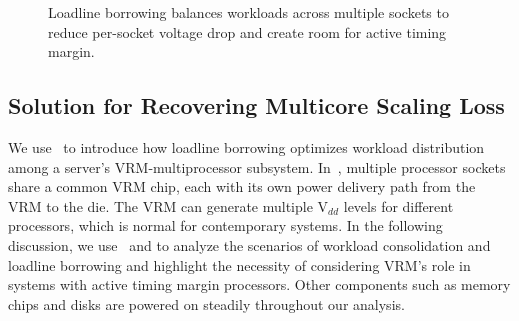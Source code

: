 \begin{figure}[!b]
\centering
\vspace*{-10pt}
\hfill
{}
\caption{Loadline borrowing balances workloads across multiple sockets to reduce per-socket voltage drop and create room for active timing margin.}
\label{fig:ll-borrow-idea}
\end{figure}

\subsection{Solution for Recovering Multicore Scaling Loss}
\label{sec:voltage:opt:loadline}

We use~ to introduce how loadline borrowing optimizes workload distribution among a server's VRM-multiprocessor subsystem. In~, multiple processor sockets share a common VRM chip, each with its own power delivery path from the VRM to the die. The VRM can generate multiple V$_{dd}$ levels for different processors, which is normal for contemporary systems. In the following discussion, we use~ and  to analyze the scenarios of workload consolidation and loadline borrowing and highlight the necessity of considering VRM's role in systems with active timing margin processors. Other components such as memory chips and disks are powered on steadily throughout our analysis.

